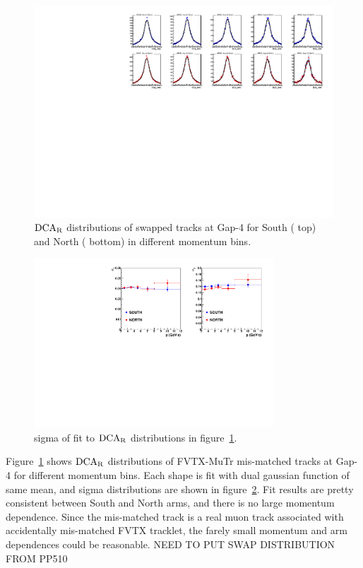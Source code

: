 \documentclass[12pt]{article}
\newcommand{\dcar}{$\rm{DCA}_{R}$ }
\begin{document}
\begin{figure}[!htb]
	\includegraphics[width=1.0\textwidth]{Figures/Run12pp200_swapped_dca_r_gap4_pbin}
	\caption{\label{fig:swap_gap4_fit} \dcar distributions of swapped tracks at Gap-4 for South ({\color{blue} top}) and North ({\color{red} bottom}) in different momentum bins.}
\end{figure}

\begin{figure}[!htb]
\begin{center}
	\includegraphics[width=0.8\textwidth]{Figures/Run12pp200_swapped_dca_r_gap4_sigma}
	\caption{\label{fig:swap_gap4_fit_sigma} sigma of fit to \dcar distributions in figure~\ref{fig:swap_gap4_fit}.}
\end{center}
\end{figure}

Figure~\ref{fig:swap_gap4_fit} shows \dcar distributions of FVTX-MuTr mis-matched tracks at Gap-4 for different momentum bins.
Each shape is fit with dual gaussian function of same mean, and sigma distributions are shown in figure~\ref{fig:swap_gap4_fit_sigma}.
Fit results are pretty consistent between South and North arms, and there is no large momentum dependence.
Since the mis-matched track is a real muon track associated with accidentally mis-matched FVTX tracklet, the farely small momentum and arm dependences could be reasonable.
{\color{red} NEED TO PUT SWAP DISTRIBUTION FROM PP510}
\end{document}
